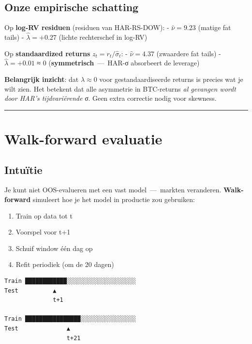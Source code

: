 \hypertarget{onze-empirische-schatting}{%
\subsection{Onze empirische schatting}\label{onze-empirische-schatting}}

Op \textbf{log-RV residuen} (residuen van HAR-RS-DOW):
- \(\hat\nu = 9.23\) (matige fat tails)
- \(\hat\lambda = +0.27\) (lichte rechterschef in log-RV)

Op \textbf{standaardized returns} \(z_t = r_t/\hat\sigma_t\):
- \(\hat\nu = 4.37\) (zwaardere fat tails)
- \(\hat\lambda = +0.01\) ≈ 0 (\textbf{symmetrisch} \,---\, HAR-σ absorbeert de leverage)

\textbf{Belangrijk inzicht}: dat \(\lambda \approx 0\) voor gestandaardiseerde returns is precies wat je wilt zien. Het betekent dat alle asymmetrie in BTC-returns \emph{al gevangen wordt door HAR's tijdvariërende σ}. Geen extra correctie nodig voor skewness.

\begin{center}\rule{0.5\linewidth}{0.5pt}\end{center}

\hypertarget{walk-forward-evaluatie}{%
\section{Walk-forward evaluatie}\label{walk-forward-evaluatie}}

\hypertarget{intuuxeftie-6}{%
\subsection{Intuïtie}\label{intuuxeftie-6}}

Je kunt niet OOS-evalueren met een vast model \,---\, markten veranderen. \textbf{Walk-forward} simuleert hoe je het model in productie zou gebruiken:

\begin{enumerate}
\def\labelenumi{\arabic{enumi}.}
\tightlist
\item
  Train op data tot t
\item
  Voorspel voor t+1
\item
  Schuif window één dag op
\item
  Refit periodiek (om de 20 dagen)
\end{enumerate}

\begin{lstlisting}
Train ████████████░░░░░░░░░░░░░░░░░░░░
Test          ▲                       
              t+1
                
Train ████████████████░░░░░░░░░░░░░░░░
Test              ▲                   
                  t+21
\end{lstlisting}

